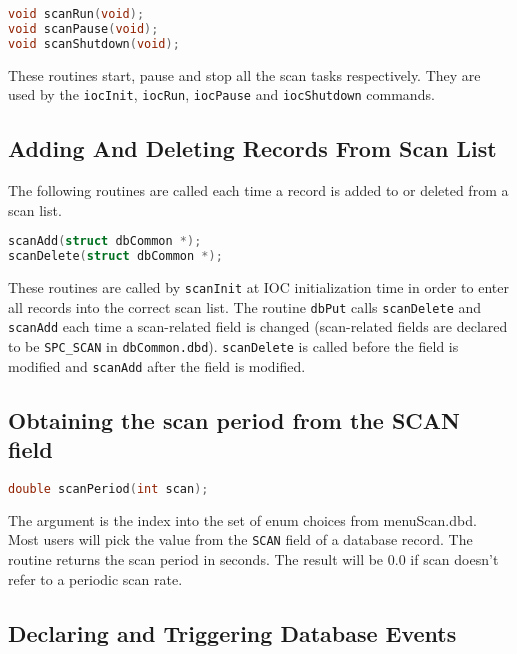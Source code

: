 \begin{lstlisting}[language=C]
void scanRun(void);
void scanPause(void);
void scanShutdown(void);
\end{lstlisting}

These routines start, pause and stop all the scan tasks respectively.
They are used by the \verb|iocInit|, \verb|iocRun|, \verb|iocPause| and \verb|iocShutdown| commands.

\subsection{Adding And Deleting Records From Scan List}

The following routines are called each time a record is added to or deleted from a scan list.

\begin{lstlisting}[language=C]
scanAdd(struct dbCommon *);
scanDelete(struct dbCommon *);
\end{lstlisting}

These routines are called by \verb|scanInit| at IOC initialization time in order to enter all records into the correct scan list.
The routine \verb|dbPut| calls \verb|scanDelete| and \verb|scanAdd| each time a scan-related field is changed (scan-related fields are declared to be \verb|SPC_SCAN| in \verb|dbCommon.dbd|).
\verb|scanDelete| is called before the field is modified and \verb|scanAdd| after the field is modified.

\subsection{Obtaining the scan period from the SCAN field}

\begin{lstlisting}[language=C]
double scanPeriod(int scan);
\end{lstlisting}

The argument is the index into the set of enum choices from menuScan.dbd.
Most users will pick the value from the \verb|SCAN| field of a database record.
The routine returns the scan period in seconds.
The result will be 0.0 if scan doesn't refer to a periodic scan rate.

\subsection{Declaring and Triggering Database Events}

